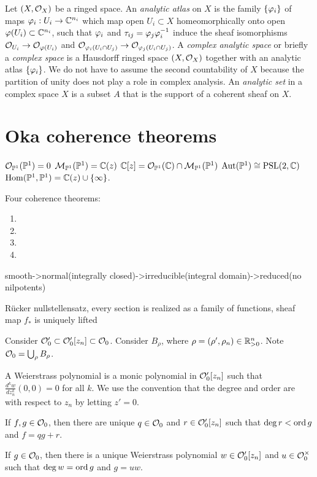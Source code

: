 \documentclass{../../large}
\begin{document}
\begin{prb}
Let $(X,\mathcal{O}_X)$ be a ringed space.
An \emph{analytic atlas} on $X$ is the family $\{\varphi_i\}$ of maps $\varphi_i:U_i\to\mathbb{C}^{n_i}$ which map open $U_i\subset X$ homeomorphically onto open $\varphi(U_i)\subset\mathbb{C}^{n_i}$, such that $\varphi_i$ and $\tau_{ij}=\varphi_j\varphi_i^{-1}$ induce the sheaf isomorphisms $\mathcal{O}_{U_i}\to\mathcal{O}_{\varphi(U_i)}$ and $\mathcal{O}_{\varphi_i(U_i\cap U_j)}\to\mathcal{O}_{\varphi_j(U_i\cap U_j)}$.
A \emph{complex analytic space} or briefly a \emph{complex space} is a Hausdorff ringed space $(X,\mathcal{O}_X)$ together with an analytic atlas $\{\varphi_i\}$.
We do not have to assume the second countability of $X$ because the partition of unity does not play a role in complex analysis.
An \emph{analytic set} in a complex space $X$ is a subset $A$ that is the support of a coherent sheaf on $X$.
\end{prb}




\section{Oka coherence theorems}

$\mathcal{O}_{\mathbb{P}^1}(\mathbb{P}^1)=0$
$\mathcal{M}_{\mathbb{P}^1}(\mathbb{P}^1)=\mathbb{C}(z)$
$\mathbb{C}[z]=\mathcal{O}_{\mathbb{P}^1}(\mathbb{C})\cap\mathcal{M}_{\mathbb{P}^1}(\mathbb{P}^1)$
$\operatorname{Aut}(\mathbb{P}^1)\cong\mathrm{PSL}(2,\mathbb{C})$
$\operatorname{Hom}(\mathbb{P}^1,\mathbb{P}^1)=\mathbb{C}(z)\cup\{\infty\}$.



Four coherence theorems:
\begin{enumerate}
\item 
\item
\item
\item
\end{enumerate}

\begin{prb}
smooth->normal(integrally closed)->irreducible(integral domain)->reduced(no nilpotents)
\end{prb}

\begin{prb}
R\"ucker nullstellensatz,
every section is realized as a family of functions,
sheaf map $f_*$ is uniquely lifted
\end{prb}

\begin{prb}
Consider $\mathcal{O}'_0\subset\mathcal{O}'_0[z_n]\subset\mathcal{O}_0$.
Consider $B_\rho$, where $\rho=(\rho',\rho_n)\in\mathbb{R}_{>0}^n$.
Note $\mathcal{O}_0=\bigcup_\rho B_\rho$.

A Weierstrass polynomial is a monic polynomial in $\mathcal{O}'_0[z_n]$ such that $\frac{d^kw}{dz_n^k}(0,0)=0$ for all $k$.
We use the convention that the degree and order are with respect to $z_n$ by letting $z'=0$.
\begin{parts}
\item If $f,g\in\mathcal{O}_0$, then there are unique $q\in\mathcal{O}_0$ and $r\in\mathcal{O}'_0[z_n]$ such that $\deg r<\operatorname{ord} g$ and $f=qg+r$.
\item If $g\in\mathcal{O}_0$, then there is a unique Weierstrass polynomial $w\in\mathcal{O}'_0[z_n]$ and $u\in\mathcal{O}_0^\times$ such that $\deg w=\operatorname{ord} g$ and $g=uw$.
\end{parts}
\end{prb}
\end{document}
